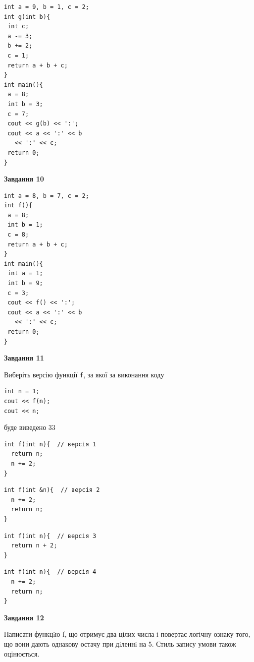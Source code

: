 \documentclass[12pt, ukrainian]{article}
\def\code#1{\Verb!#1!}
\begin{document}
{\begin {large}
\begin{minipage}[t]{7.0cm}
\begin{verbatim}
int a = 9, b = 1, c = 2;
int g(int b){
 int c;
 a -= 3;
 b += 2;
 c = 1;
 return a + b + c;
}
int main(){
 a = 8;
 int b = 3;
 c = 7;
 cout << g(b) << ':';
 cout << a << ':' << b 
   << ':' << c;
 return 0;
}
\end{verbatim}



\begin{center}
\textbf{Завдання 10}
\end{center}
\vspace{-8mm}

\begin{verbatim}
int a = 8, b = 7, c = 2;
int f(){
 a = 8;
 int b = 1;
 c = 8;
 return a + b + c;
}
int main(){
 int a = 1;
 int b = 9;
 c = 3;
 cout << f() << ':';
 cout << a << ':' << b 
   << ':' << c;
 return 0;
}
\end{verbatim}

\end{minipage}
\vline \hspace{1mm}
\begin{minipage}[t]{11.0cm}

\begin{center}
\textbf{Завдання 11}
\end{center}
Виберіть версію функції \code{f}, за якої за виконання коду
\begin{verbatim}
int n = 1;
cout << f(n);
cout << n;
\end{verbatim}

буде виведено 33

\begin{verbatim}
int f(int n){  // версія 1
  return n;
  n += 2;
}
\end{verbatim}

\vspace{-8mm}\begin{verbatim}
int f(int &n){  // версія 2
  n += 2;
  return n;
}
\end{verbatim}

\vspace{-8mm}\begin{verbatim}
int f(int n){  // версія 3
  return n + 2;
}
\end{verbatim}

\vspace{-8mm}\begin{verbatim}
int f(int n){  // версія 4
  n += 2;
  return n;
}
\end{verbatim}



\begin{center}
\textbf{Завдання 12}
\end{center}

Написати функцiю f, що отримує два цілих числа і повертає логічну ознаку того, що вони дають однакову остачу при дiленнi на 5. Стиль запису умови також оцінюється.\par

\end{minipage}

\end {large}}
\newpage
\end{document}
